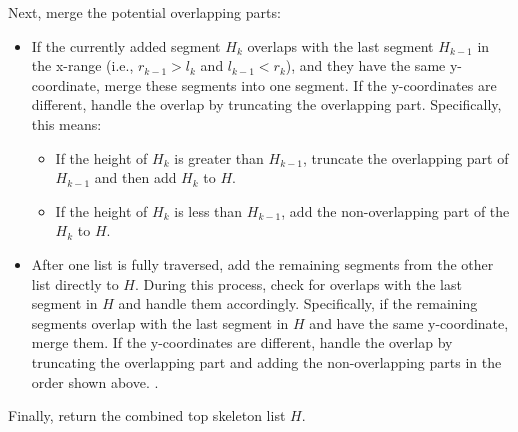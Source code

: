 \documentclass[12pt]{article}
\begin{document}
        Next, merge the potential overlapping parts:
        \begin{itemize}
            \item If the currently added segment \( H_k \) overlaps with the last segment \( H_{k-1} \) in the x-range (i.e., \( r_{k-1} > l_k \) and \( l_{k-1} < r_k \)), and they have the same y-coordinate, merge these segments into one segment. If the y-coordinates are different, handle the overlap by truncating the overlapping part. Specifically, this means:

            \begin{itemize}
                \item If the height of \( H_k \) is greater than \( H_{k-1} \), truncate the overlapping part of \( H_{k-1} \) and then add \( H_k \) to \( H \).
                \item If the height of \( H_k \) is less than \( H_{k-1} \), add the non-overlapping part of the \( H_k \) to \( H \).
            \end{itemize}

            \item After one list is fully traversed, add the remaining segments from the other list directly to \( H \). During this process, check for overlaps with the last segment in \( H \) and handle them accordingly. Specifically, if the remaining segments overlap with the last segment in \( H \) and have the same y-coordinate, merge them. If the y-coordinates are different, handle the overlap by truncating the overlapping part and adding the non-overlapping parts in the order shown above.
.

        \end{itemize}

        Finally, return the combined top skeleton list $H$.
\end{document}

